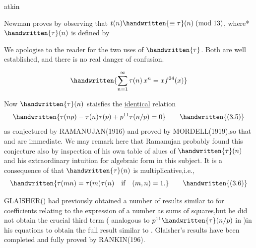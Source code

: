 \noindent\hfill atkin 

Newman proves  by observing that $t(n)\handwritten{\equiv\tau}(n)\;(\mathrm{mod}\;13)$, where* $\handwritten{\tau}(n)$ is defined by

\noindent\handwritten{\rule{\linewidth}{0.4pt}}

\noindent *We apologise to the reader for the two uses of $\handwritten{\tau}$. Both are well established, and there is no real danger of confusion.

\noindent\handwritten{\rule{\linewidth}{0.4pt}}

\[
\handwritten{\sum_{n=1}^{\infty}\tau(n)\,x^{n}=xf^{24}(x)}
\]

Now $\handwritten{\tau}(n)$ staisfies the \uline{identical} relation
\[
\handwritten{\tau(np)-\tau(n)\tau(p)+p^{11}\tau(n/p)=0}
\tag*{\handwritten{(3.5)}}
\]
as conjectured by RAMANUJAN(1916) and proved by MORDELL(1919),so that  and  are immediate. We may remark here that Ramanujan probably found this conjecture also by inspection of his own table of alues of $\handwritten{\tau}(n)$ and his extraordinary intuition for algebraic form in this subject. It is a consequence of  that $\handwritten{\tau}(n)$ is multiplicative,i.e.,
\[
\handwritten{\tau(mn)=\tau(m)\tau(n)\quad\text{if}\quad (m,n)=1.}
\tag*{\handwritten{(3.6)}}
\]

GLAISHER() had previously obtained a number of results similar to  for coefficients relating to the expression of a number as sums of squares,but he did not obtain the crucial third term ( analogous to $p^{11}\handwritten{\tau}(n/p)$ in )in his equations to obtain the full result similar to . Glaisher's results have been completed and fully proved by RANKIN(196\hspace{1em}).

